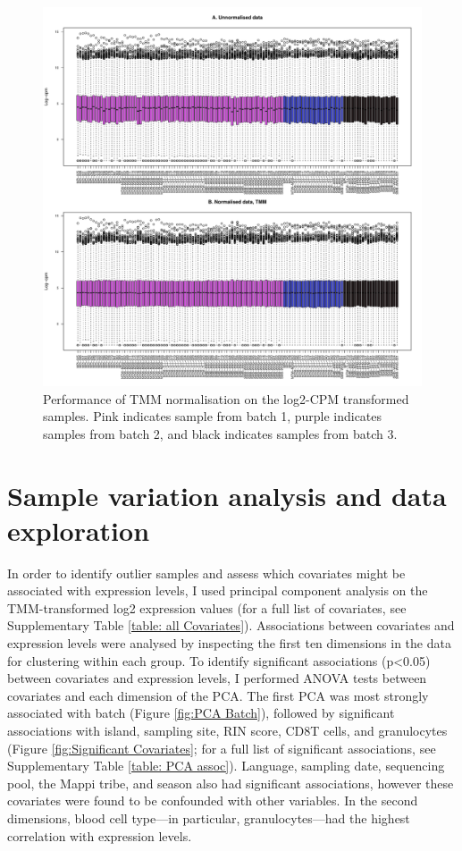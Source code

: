 \documentclass[12pt,a4paper,titlepage,twoside,openright]{book}
\begin{document}
\begin{mainmatter}
{{\begin{figure}[htb!]
\centering
\includegraphics[width=\textwidth,height=\textheight,keepaspectratio]{Figures/NormalisedGeneExpressionDistribution_IndoRNA_TMM.pdf}
\caption{Performance of TMM normalisation on the log2-CPM transformed samples. Pink indicates sample from batch 1, purple indicates samples from batch 2, and black indicates samples from batch 3.}
\label{fig:TMM normalisation}
\end{figure}

\section{Sample variation analysis and data exploration}
In order to identify outlier samples and assess which covariates might be associated with expression levels, I used principal component analysis on the TMM-transformed log2 expression values (for a full list of covariates, see Supplementary Table \ref{table: all Covariates}). Associations between covariates and expression levels were analysed by inspecting the first ten dimensions in the data for clustering within each group. To identify significant associations (p<0.05) between covariates and expression levels, I performed ANOVA tests between covariates and each dimension of the PCA. The first PCA was most strongly associated with batch (﻿Figure \ref{fig:PCA Batch}), followed by significant associations with island, sampling site, RIN score, CD8T cells, and granulocytes (﻿Figure \ref{fig:Significant Covariates}; for a full list of significant associations, see Supplementary Table \ref{table: PCA assoc}). Language, sampling date, sequencing pool, the Mappi tribe, and season also had significant associations, however these covariates were found to be confounded with other variables. In the second dimensions, blood cell type—in particular, granulocytes—had the highest correlation with expression levels. 

}}
\end{mainmatter}
\end{document}
